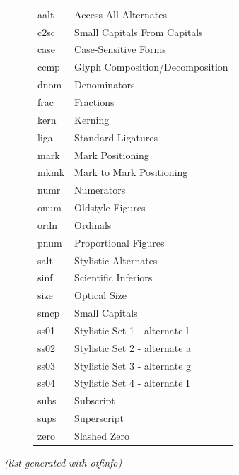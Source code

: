 \documentclass[11pt,a4paper,english]{article}
\begin{document}
\begin{figure}[ht]
	\centering
	\begin{tabular}{>{\ttfamily}l l}
		aalt & Access All Alternates \\
		c2sc & Small Capitals From Capitals \\
		case & Case-Sensitive Forms \\
		ccmp & Glyph Composition/Decomposition \\
		dnom & Denominators \\
		frac & Fractions \\
		kern & Kerning \\
		liga & Standard Ligatures \\
		mark & Mark Positioning \\
		mkmk & Mark to Mark Positioning \\
		numr & Numerators \\
		onum & Oldstyle Figures \\
		ordn & Ordinals \\
		pnum & Proportional Figures \\
		salt & Stylistic Alternates \\
		sinf & Scientific Inferiors \\
		size & Optical Size \\
		smcp & Small Capitals \\
		ss01 & Stylistic Set 1 - alternate l \\
		ss02 & Stylistic Set 2 - alternate a \\
		ss03 & Stylistic Set 3 - alternate g \\
		ss04 & Stylistic Set 4 - alternate I \\
		subs & Subscript \\
		sups & Superscript \\
		zero & Slashed Zero
	\end{tabular}
\end{figure}
\textit{(list generated with otfinfo)}
\end{document}
